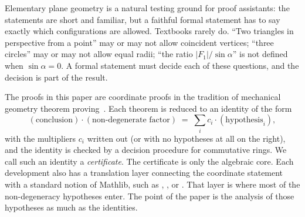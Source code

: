 \documentclass[11pt]{article}
\theoremstyle{definition}
\theoremstyle{remark}
\begin{document}
Elementary plane geometry is a natural testing ground for proof assistants: the statements are
short and familiar, but a faithful formal statement has to say exactly which configurations are
allowed. Textbooks rarely do. ``Two triangles in perspective from a point'' may or may not
allow coincident vertices; ``three circles'' may or may not allow equal radii; ``the ratio
$|F_1|/\sin\alpha$'' is not defined when $\sin\alpha=0$. A formal statement must decide each of
these questions, and the decision is part of the result.

The proofs in this paper are coordinate proofs in the tradition of mechanical geometry theorem
proving~\cite{Chou}. Each theorem is reduced to an identity of the form
\[
  (\text{conclusion})\cdot(\text{non-degenerate factor}) \;=\; \sum_i c_i\cdot(\text{hypothesis}_i),
\]
with the multipliers $c_i$ written out (or with no hypotheses at all on the right), and the
identity is checked by a decision procedure for commutative rings. We call such an identity a
\emph{certificate}. The certificate is only the algebraic core. Each development also has a
translation layer connecting the coordinate statement with a standard notion of Mathlib, such as
, ,  or
. That layer is where most of the non-degeneracy hypotheses enter. The
point of the paper is the analysis of those hypotheses as much as the identities.
\end{document}
